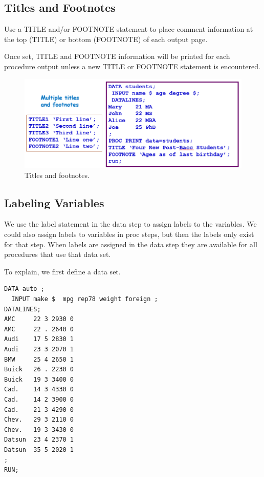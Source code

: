 \documentclass[
]{book}
\begin{document}
\hypertarget{titles-and-footnotes}{%
\subsection{Titles and Footnotes}\label{titles-and-footnotes}}

Use a TITLE and/or FOOTNOTE statement to place comment information at the top (TITLE) or bottom (FOOTNOTE) of each output page.

Once set, TITLE and FOOTNOTE information will be printed for each procedure output unless a new TITLE or FOOTNOTE statement is encountered.

\begin{figure}

{\centering \includegraphics[width=0.6\linewidth]{img03/w03-TitlesFootnotes} 

}

\caption{Titles and footnotes.}\label{fig:unnamed-chunk-23}
\end{figure}

\hypertarget{labeling-variables}{%
\subsection{Labeling Variables}\label{labeling-variables}}

We use the label statement in the data step to assign labels to the variables. We could also assign labels to variables in proc steps, but then the labels only exist for that step. When labels are assigned in the data step they are available for all procedures that use that data set.

To explain, we first define a data set.

\begin{verbatim}
DATA auto ;
  INPUT make $  mpg rep78 weight foreign ;
DATALINES;
AMC     22 3 2930 0
AMC     22 . 2640 0
Audi    17 5 2830 1
Audi    23 3 2070 1
BMW     25 4 2650 1
Buick   26 . 2230 0
Buick   19 3 3400 0
Cad.    14 3 4330 0
Cad.    14 2 3900 0
Cad.    21 3 4290 0
Chev.   29 3 2110 0
Chev.   19 3 3430 0
Datsun  23 4 2370 1
Datsun  35 5 2020 1
;
RUN;
\end{verbatim}
\end{document}

